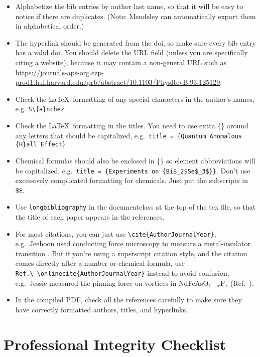 \documentclass[aps,prb,twocolumn,superscriptaddress,floatfix,longbibliography]{revtex4-2}
\begin{document}
\begin{itemize}[label=$\Box$]
\item Alphabetize the bib entries by author last name, so that it will be easy to notice if there are duplicates. (Note: Mendeley can automatically export them in alphabetical order.)
\item The hyperlink should be generated from the doi, so make sure every bib entry has a valid doi. You should delete the URL field (unless you are specifically citing a website), because it may contain a non-general URL such as \url{https://journals-aps-org.ezp-prod1.hul.harvard.edu/prb/abstract/10.1103/PhysRevB.93.125129}.
\item Check the \LaTeX\ formatting of any special characters in the author's names, e.g. {\tt S\textbackslash\textquotesingle\{a\}nchez}
\item Check the \LaTeX\ formatting in the titles. You need to use extra \{\} around any letters that should be capitalized, e.g.\ {\tt title = \{Quantum Anomalous \{H\}all Effect\} }
\item Chemical formulas should also be enclosed in \{\} so element abbreviations will be capitalized, e.g.\ {\tt title = \{Experiments on \{Bi\$\_2\$Se\$\_3\$\}\}}. Don't use excessively complicated formatting for chemicals. Just put the subscripts in \$\$.
\item Use {\tt longbibliography} in the documentclass at the top of the tex file, so that the title of each paper appears in the references.
\item For most citations, you can just use {\tt \textbackslash cite\{AuthorJournalYear\}}, e.g.\ Jeehoon used conducting force microscopy to measure a metal-insulator transition \cite{KimAPL2010}. But if you're using a superscript citation style, and the citation comes directly after a number or chemical formula, use {\tt Ref.\textbackslash\ \textbackslash onlinecite\{AuthorJournalYear\}} instead to avoid confusion, e.g.\ Jessie measured the pinning force on vortices in NdFeAsO$_{1-x}$F$_x$ (Ref.\ ).
\item In the compiled PDF, check all the references carefully to make sure they have correctly formatted authors, titles, and hyperlinks.
\end{itemize}

\section{\label{sec:Integrity}Professional Integrity Checklist}
\end{document}
